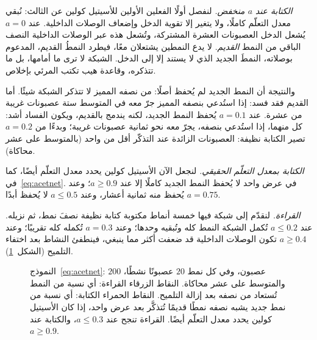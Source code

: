 \emph{الكتابة عند $a$ منخفض.} لنفصل أولًا الفعلين الأولين للأسيتيل كولين عن الثالث: نُبقي معدل التعلّم كاملًا، ولا يتغير إلا تقوية الدخل وإضعاف الوصلات الداخلية. عند $a=0$ يُشعل الدخل العصبونات العشرة المشتركة، وتُشعل هذه عبر الوصلات الداخلية النصف الباقي من النمط \emph{القديم}. لا يدع  النمطين يشتعلان معًا، فيطرد النمطُ القديم، المدعوم بوصلاته، النمطَ الجديد الذي لا يستند إلا إلى الدخل. الشبكة لا ترى ما أمامها، بل ما تتذكره، وقاعدة هيب تكتب المرئي بإخلاص.

والنتيجة أن النمط الجديد لم يُحفظ أصلًا: من نصفه المميز لا تتذكر الشبكة شيئًا. أما القديم فقد فسد: إذا استُدعي بنصفه المميز جرّ معه في المتوسط ستة عصبونات غريبة من عشرة. عند $a=0.1$ يُحفظ النمط الجديد، لكنه يندمج بالقديم، ويكون الفساد أشد: كل منهما، إذا استُدعي بنصفه، يجرّ معه نحو ثمانية عصبونات غريبة؛ وبدءًا من $a=0.2$ تصير الكتابة نظيفة: العصبونات الزائدة عند التذكّر أقل من واحد (بالمتوسط على عشر محاكاة).

\emph{الكتابة بمعدل التعلّم الحقيقي.} لنجعل الآن الأسيتيل كولين يحدد معدل التعلّم أيضًا، كما في~\eqref{eq:acetnet}. في عرض واحد لا يُحفظ النمط الجديد كاملًا إلا عند $a\ge0.9$؛ وعند $a=0.75$ يُحفظ منه ثمانية أعشار، وعند $a\le0.5$ لا يُحفظ أبدًا.

\emph{القراءة.} لنقدّم إلى شبكة فيها خمسة أنماط مكتوبة كتابة نظيفة نصفَ نمط، ثم نزيله. عند $a\le0.2$ تُكمل الشبكة النمط كله وتُبقيه وحدها؛ وعند $a=0.3$ تُكمله كله تقريبًا؛ وعند $a\ge0.4$ تكون الوصلات الداخلية قد ضعفت أكثر مما ينبغي، فينطفئ النشاط بعد اختفاء التلميح (الشكل~\ref{fig:acetsim}).

\begin{figure}[t]
\centering
{}
\caption{النموذج~\eqref{eq:acetnet}: $200$ عصبون، وفي كل نمط $20$ عصبونًا نشطًا، والمتوسط على عشر محاكاة. النقاط الزرقاء القراءة: أي نسبة من النمط تُستعاد من نصفه بعد إزالة التلميح. النقاط الحمراء الكتابة: أي نسبة من نمط جديد يشبه نصفه نمطًا قديمًا تُتذكَّر بعد عرض واحد، إذا كان الأسيتيل كولين يحدد معدل التعلّم أيضًا. القراءة تنجح عند $a\le0.3$، والكتابة عند $a\ge0.9$.}
\label{fig:acetsim}
\end{figure}

